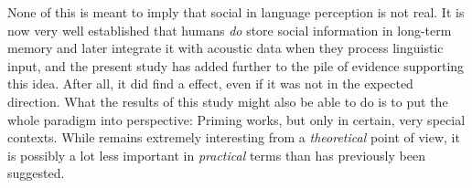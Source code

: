 None of this is meant to imply that social  in language perception is not real.
It is now very well established that humans \emph{do} store social information in long-term memory and later integrate it with acoustic data when they process linguistic input, and the present study has added further to the pile of evidence supporting this idea.
After all, it did find a  effect, even if it was not in the expected direction.
What the results of this study might also be able to do is to put the whole  paradigm into perspective: Priming works, but only in certain, very special contexts.
While   remains extremely interesting from a \emph{theoretical} point of view, it is possibly a lot less important in \emph{practical} terms than has previously been suggested.